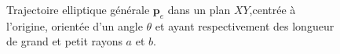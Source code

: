\begin{figure}[h!]
\centering
{}
\caption[Trajectoire elliptique]{\label{chap1:fig:ell_c}Trajectoire elliptique générale $\mathbf{p}_e$ dans un plan $XY$,centrée à l'origine, orientée d'un angle $\theta$ et ayant respectivement des longueur de grand et petit rayons $a$ et $b$.}
\end{figure}